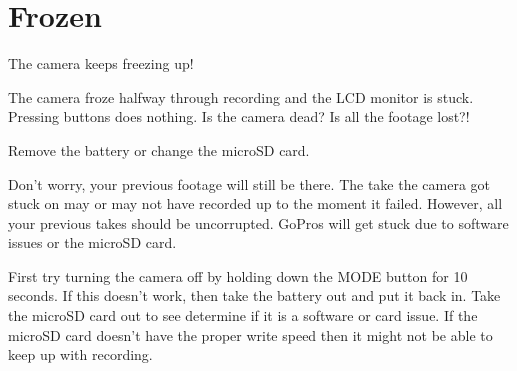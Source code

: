 \chapter{Frozen}
\pagecolor{white}
\label{chap:18}
\begin{fullwidth}


\problem

{\large The camera keeps freezing up! \par}

The camera froze halfway through recording and the LCD monitor is stuck. Pressing buttons does nothing. Is the camera dead? Is all the footage lost?! 


\solution

{\large Remove the battery or change the microSD card. \par}

Don’t worry, your previous footage will still be there. The take the camera got stuck on may or may not have recorded up to the moment it failed. However, all your previous takes should be uncorrupted. GoPros will get stuck due to software issues or the microSD card. 

First try turning the camera off by holding down the MODE button for 10 seconds. 
If this doesn’t work, then take the battery out and put it back in. Take the microSD card out to see determine if it is a software or card issue. If the microSD card doesn't have the proper write speed then it might not be able to keep up with recording. 






\clearpage
\end{fullwidth}
